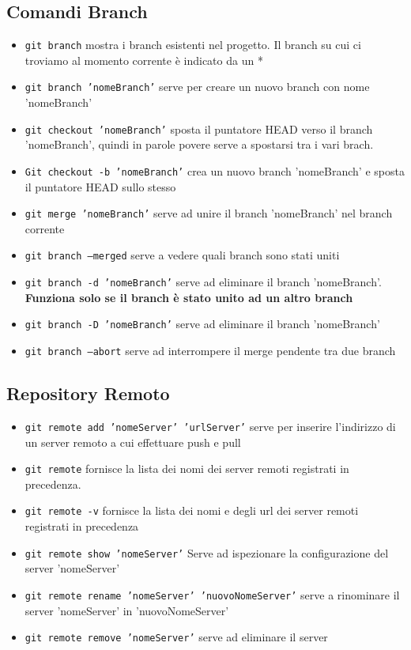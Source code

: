 \documentclass[12pt, a4paper]{article}
\begin{document}
\subsection{Comandi Branch}
\begin{itemize}
    \item \texttt{git branch} mostra i branch esistenti nel progetto. Il branch su cui ci troviamo al momento corrente è indicato da un *
    \item \texttt{git branch 'nomeBranch'} serve per creare un nuovo branch con nome 'nomeBranch'
    \item \texttt{git checkout 'nomeBranch'} sposta il puntatore HEAD verso il branch 'nomeBranch', quindi in parole povere serve a spostarsi tra i vari brach.
    \item \texttt{Git checkout -b 'nomeBranch'} crea un nuovo branch 'nomeBranch' e sposta il puntatore HEAD sullo stesso
    \item \texttt{git merge 'nomeBranch'} serve ad unire il branch 'nomeBranch' nel branch corrente
    \item \texttt{git branch --merged} serve a vedere quali branch sono stati uniti
    \item \texttt{git branch -d 'nomeBranch'} serve ad eliminare il branch 'nomeBranch'. \textbf{Funziona solo se il branch è stato unito ad un altro branch}
    \item \texttt{git branch -D 'nomeBranch'} serve ad eliminare il branch 'nomeBranch'
    \item \texttt{git branch --abort} serve ad interrompere il merge pendente tra due branch
\end{itemize}

\subsection{Repository Remoto}
\begin{itemize}
    \item \texttt{git remote add 'nomeServer' 'urlServer'} serve per inserire l’indirizzo di un server remoto a cui effettuare push e pull
    \item \texttt{git remote} fornisce la lista dei nomi dei server remoti registrati in precedenza.
    \item \texttt{git remote -v} fornisce la lista dei nomi e degli url dei server remoti registrati in precedenza
    \item \texttt{git remote show 'nomeServer'} Serve ad ispezionare la configurazione del server 'nomeServer'
    \item \texttt{git remote rename 'nomeServer' 'nuovoNomeServer'} serve a rinominare il server 'nomeServer' in 'nuovoNomeServer'
    \item \texttt{git remote remove 'nomeServer'} serve ad eliminare il server
\end{itemize}
\end{document}
